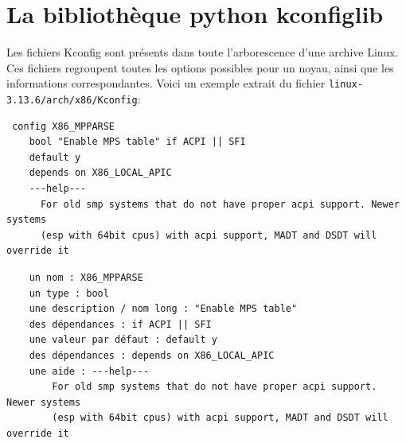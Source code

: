 \documentclass[17pts]{report}
\begin{document}
\section{La bibliothèque python kconfiglib}
\label{sec:La bibliothèque python kconfiglib}

Les fichiers Kconfig sont présents dans toute l'arborescence d'une archive
Linux.  Ces fichiers regroupent toutes les options possibles pour un noyau,
ainsi que les informations correspondantes.  Voici un exemple extrait du
fichier \verb|linux-3.13.6/arch/x86/Kconfig|:
\begin{verbatim}
 config X86_MPPARSE
    bool "Enable MPS table" if ACPI || SFI
    default y
    depends on X86_LOCAL_APIC
    ---help---
      For old smp systems that do not have proper acpi support. Newer systems
      (esp with 64bit cpus) with acpi support, MADT and DSDT will override it
\end{verbatim}
\begin{verbatim}
    un nom : X86_MPPARSE
    un type : bool
    une description / nom long : "Enable MPS table"
    des dépendances : if ACPI || SFI
    une valeur par défaut : default y
    des dépendances : depends on X86_LOCAL_APIC
    une aide : ---help---
        For old smp systems that do not have proper acpi support. Newer systems
        (esp with 64bit cpus) with acpi support, MADT and DSDT will override it
\end{verbatim}
\end{document}
